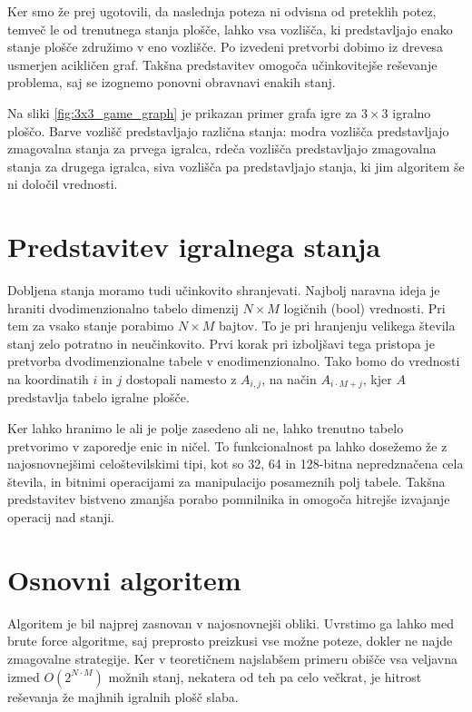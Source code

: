 \documentclass[12pt]{report}
\begin{document}
Ker smo že prej ugotovili, da naslednja poteza ni odvisna od preteklih potez, temveč le od trenutnega stanja plošče, lahko vsa vozlišča, ki predstavljajo enako stanje plošče združimo v eno vozlišče. Po izvedeni pretvorbi dobimo iz drevesa usmerjen acikličen graf. Takšna predstavitev omogoča učinkovitejše reševanje problema, saj se izognemo ponovni obravnavi enakih stanj.

Na sliki \ref{fig:3x3_game_graph} je prikazan primer grafa igre za $3 \times 3$ igralno ploščo. Barve vozlišč predstavljajo različna stanja: modra vozlišča predstavljajo zmagovalna stanja za prvega igralca, rdeča vozlišča predstavljajo zmagovalna stanja za drugega igralca, siva vozlišča pa predstavljajo stanja, ki jim algoritem še ni določil vrednosti.



\section{Predstavitev igralnega stanja}
Dobljena stanja moramo tudi učinkovito shranjevati. Najbolj naravna ideja je hraniti dvodimenzionalno tabelo dimenzij $N \times M$ logičnih (bool) vrednosti. Pri tem za vsako stanje porabimo $N \times M$ bajtov. To je pri hranjenju velikega števila stanj zelo potratno in neučinkovito. Prvi korak pri izboljšavi tega pristopa je pretvorba dvodimenzionalne tabele v enodimenzionalno. Tako bomo do vrednosti na koordinatih $i$ in $j$ dostopali namesto z $A_{i,j}$, na način $A_{i\cdot M+j}$, kjer $A$ predstavlja tabelo igralne plošče.

Ker lahko hranimo le ali je polje zasedeno ali ne, lahko trenutno tabelo pretvorimo v zaporedje enic in ničel. To funkcionalnost pa lahko dosežemo že z najosnovnejšimi celoštevilskimi tipi, kot so 32, 64 in 128-bitna nepredznačena cela števila, in bitnimi operacijami za manipulacijo posameznih polj tabele. Takšna predstavitev bistveno zmanjša porabo pomnilnika in omogoča hitrejše izvajanje operacij nad stanji.

\section{Osnovni algoritem}
Algoritem je bil najprej zasnovan v najosnovnejši obliki. Uvrstimo ga lahko med brute force algoritme, saj preprosto preizkusi vse možne poteze, dokler ne najde zmagovalne strategije. Ker v teoretičnem najslabšem primeru obišče vsa veljavna izmed $O(2^{N \cdot M})$ možnih stanj, nekatera od teh pa celo večkrat, je hitrost reševanja že majhnih igralnih plošč slaba.
\end{document}
